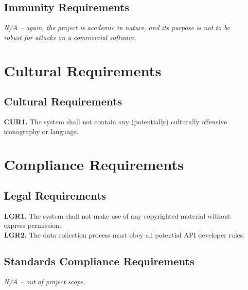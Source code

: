 \documentclass[12pt]{article}
\begin{document}
\subsection{Immunity Requirements}
\emph{N/A -- again, the project is academic in nature, and its purpose is not to be robust for attacks on a commercial software.}
\section{Cultural Requirements}
\subsection{Cultural Requirements}
\textbf{CUR1.} The system shall not contain any (potentially) culturally offensive iconography or language.
\section{Compliance Requirements}
\subsection{Legal Requirements}
\textbf{LGR1.} The system shall not make use of any copyrighted material without express permission. \\
\textbf{LGR2.} The data collection process must obey all potential API developer rules.
\subsection{Standards Compliance Requirements}
\emph{N/A -- out of project scope.}
\end{document}

